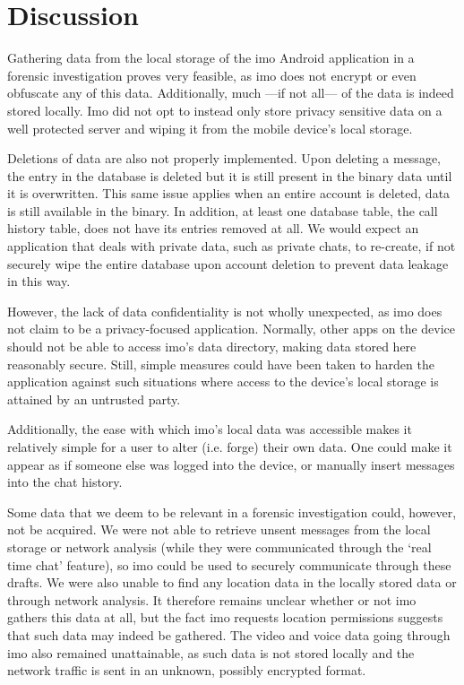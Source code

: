 \documentclass[conference]{IEEEtran}
\begin{document}
\section{Discussion}\label{sec:disc}

Gathering data from the local storage of the imo Android application in a
forensic investigation proves very feasible, as imo does not encrypt or even
obfuscate any of this data. Additionally, much ---if not all--- of the data is
indeed stored locally. Imo did not opt to instead only store privacy sensitive
data on a well protected server and wiping it from the mobile device's local
storage.

Deletions of data are also not properly implemented. Upon deleting a message,
the entry in the database is deleted but it is still present in the binary data
until it is overwritten. This same issue applies when an entire account is
deleted, data is still available in the binary. In addition, at least one
database table, the call history table, does not have its entries removed at
all. We would expect an application that deals with private data, such as
private chats, to re-create, if not securely wipe the entire database upon
account deletion to prevent data leakage in this way.

However, the lack of data confidentiality is not wholly unexpected, as imo does
not claim to be a privacy-focused application. Normally, other apps on the
device should not be able to access imo's data directory, making data stored
here reasonably secure. Still, simple measures could have been taken to harden
the application against such situations where access to the device's local
storage is attained by an untrusted party.

Additionally, the ease with which imo's local data was accessible makes it
relatively simple for a user to alter (i.e. forge) their own data. One could
make it appear as if someone else was logged into the device, or manually insert
messages into the chat history.

Some data that we deem to be relevant in a forensic investigation could,
however, not be acquired. We were not able to retrieve unsent messages from the
local storage or network analysis (while they were communicated through the
`real time chat' feature), so imo could be used to securely communicate through
these drafts. We were also unable to find any location data in the locally
stored data or through network analysis. It therefore remains unclear whether
or not imo gathers this data at all, but the fact imo requests location
permissions suggests that such data may indeed be gathered. The video and voice
data going through imo also remained unattainable, as such data is not stored
locally and the network traffic is sent in an unknown, possibly encrypted
format.
\end{document}
